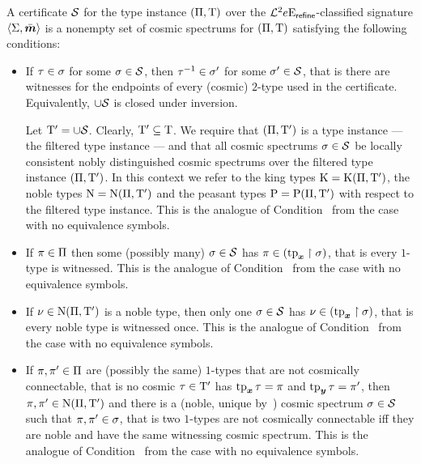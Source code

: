 \begin{definition}
A certificate $\mathcal{S}$ for the type instance $(\Pi,\mathrm{T})$ over the
$\mathcal{L}^{2}{e}\mathrm{E}_{\mathsf{refine}}$-classified signature $\left\langle \mathrm{\Sigma},\bar{\bm{m}} \right\rangle$ is a nonempty
set of cosmic spectrums for $(\Pi,\mathrm{T})$ satisfying the following
conditions:
\begin{itemize}
  \item[\certcondIp]\label{cond:cert-Ip}
  If $\tau \in \sigma$ for some $\sigma \in \mathcal{S}$, then
  $\tau^{-1} \in {\sigma'}$ for some ${\sigma'} \in \mathcal{S}$, that is there are
  witnesses for the endpoints of every (cosmic) $2$-type used in the
  certificate. Equivalently, $\cup\mathcal{S}$ is closed under inversion.
  
  Let ${\mathrm{T}'} = \cup\mathcal{S}$. Clearly, ${\mathrm{T}'} \subseteq \mathrm{T}$. We require that
  $(\Pi,{\mathrm{T}'})$ is a type instance --- the filtered type instance --- and
  that all cosmic spectrums $\sigma \in \mathcal{S}$ be locally consistent nobly
  distinguished cosmic spectrums over the filtered type instance
  $(\Pi,{\mathrm{T}'})$.
  In this context we refer to the king types $\mathrm{K} = \mathrm{K}(\Pi,{\mathrm{T}'})$, the noble types $\mathrm{\mathrm{N}} = \mathrm{\mathrm{N}}(\Pi,{\mathrm{T}'})$ and the peasant
  types $\mathrm{P} = \mathrm{P}(\Pi,{\mathrm{T}'})$ with respect to the filtered type instance.
  This is the analogue of Condition~ from the case with no
  equivalence symbols.
  \item[\certcondIIp]\label{cond:cert-IIp}
  If $\pi \in \Pi$ then some (possibly many) $\sigma
  \in \mathcal{S}$ has $\pi \in (\operatorname{tp}_{\bm{x}}\restriction\sigma)$, that is every
  $1$-type is witnessed. This is the analogue of
  Condition~ from the case with no equivalence symbols.
  \item[\certcondIIIp]\label{cond:cert-IIIp}
  If $\nu \in \mathrm{\mathrm{N}}(\Pi,{\mathrm{T}'})$ is a noble type, then only one $\sigma \in
  \mathcal{S}$ has $\nu \in (\operatorname{tp}_{\bm{x}}\restriction\sigma)$, that is every noble type is
  witnessed once. This is the analogue of Condition~ from the case
  with no equivalence symbols.
  \item[\certcondIVp]\label{cond:cert-IVp}
  If $\pi,{\pi'} \in \Pi$ are (possibly the same) $1$-types that are not
  cosmically connectable, that is no cosmic $\tau \in {\mathrm{T}'}$ has $\operatorname{tp}_{\bm{x}}\tau =
  \pi$ and $\operatorname{tp}_{\bm{y}}\tau = {\pi'}$, then $\pi, {\pi'} \in \mathrm{\mathrm{N}}(\Pi,{\mathrm{T}'})$ and
  there is a (noble, unique by~) cosmic spectrum $\sigma \in
  \mathcal{S}$ such that $\pi, {\pi'} \in \sigma$, that is two $1$-types are not
   cosmically connectable iff they are noble and have the same witnessing cosmic
   spectrum. This is the analogue of Condition~ from the case with
   no equivalence symbols.
\end{itemize}
\end{definition}
